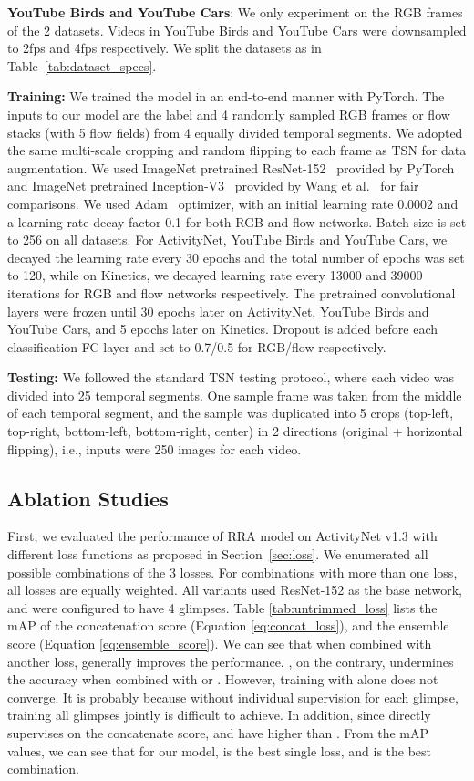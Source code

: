 \documentclass[runningheads]{llncs}
\begin{document}
\textbf{YouTube Birds and YouTube Cars}: We only experiment on the RGB frames of the 2 datasets. Videos in YouTube Birds and YouTube Cars were downsampled to 2fps and 4fps respectively. We split the datasets as in Table~\ref{tab:dataset_specs}.

\textbf{Training:} We trained the model in an end-to-end manner with PyTorch. The inputs to our model are the label and 4 randomly sampled RGB frames or flow stacks (with 5 flow fields) from 4 equally divided temporal segments. We adopted the same multi-scale cropping and random flipping to each frame as TSN for data augmentation. We used ImageNet pretrained ResNet-152~\cite{he2016deep} provided by PyTorch and ImageNet pretrained Inception-V3~\cite{szegedy2016rethinking} provided by Wang et al.~\cite{wang2016temporal} for fair comparisons. We used Adam~\cite{kingma2014adam} optimizer, with an initial learning rate 0.0002 and a learning rate decay factor 0.1 for both RGB and flow networks. Batch size is set to 256 on all datasets. For ActivityNet, YouTube Birds and YouTube Cars, we decayed the learning rate every 30 epochs and the total number of epochs was set to 120, while on Kinetics, we decayed learning rate every 13000 and 39000 iterations for RGB and flow networks respectively. The pretrained convolutional layers were frozen until 30 epochs later on ActivityNet, YouTube Birds and YouTube Cars, and 5 epochs later on Kinetics. Dropout is added before each classification FC layer and set to 0.7/0.5 for RGB/flow respectively.

\textbf{Testing:}
We followed the standard TSN testing protocol, where each video was divided into 25 temporal segments.
One sample frame was taken from the middle of each temporal segment, and the sample was duplicated into 5 crops (top-left, top-right, bottom-left, bottom-right, center) in 2 directions (original + horizontal flipping), i.e., inputs were 250 images for each video. 

\subsection{Ablation Studies}
First, we evaluated the performance of RRA model on ActivityNet v1.3 with different loss functions as proposed in Section~\ref{sec:loss}.
We enumerated all possible combinations of the 3 losses.
For combinations with more than one loss, all losses are equally weighted.
All variants used ResNet-152 as the base network, and were configured to have 4 glimpses.
Table \ref{tab:untrimmed_loss} lists the mAP of the concatenation score (Equation \ref{eq:concat_loss}), and the ensemble score (Equation \ref{eq:ensemble_score}).
We can see that when combined with another loss,  generally improves the performance. , on the contrary, undermines the accuracy when combined with  or . However, training with  alone does not converge. It is probably because without individual supervision for each glimpse, training all glimpses jointly is difficult to achieve. In addition, since  directly supervises on the concatenate score,  and  have higher  than . From the mAP values, we can see that for our model,  is the best single loss, and  is the best combination.
\end{document}

